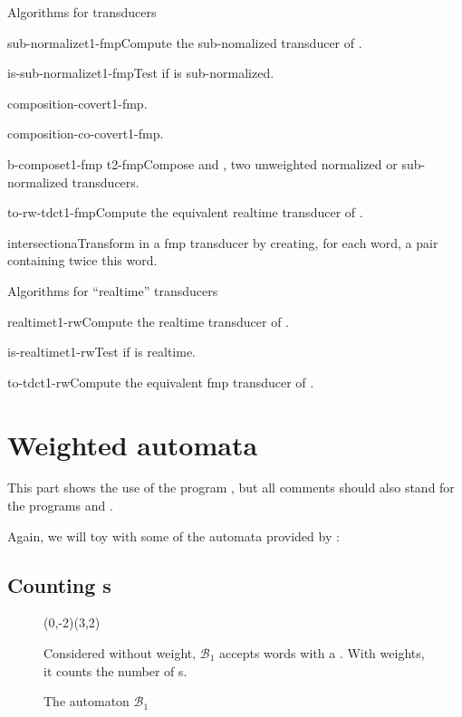\begin{fnsection}{Algorithms for transducers}
\item{sub-normalize}{t1-fmp}{Compute the sub-nomalized transducer of
    .}
\item{is-sub-normalize}{t1-fmp}{Test if  is
    sub-normalized.}
\item{composition-cover}{t1-fmp}{.}%
\item{composition-co-cover}{t1-fmp}{.}%
\item{b-compose}{t1-fmp t2-fmp}{Compose  and
    , two unweighted normalized or sub-normalized
    transducers.}
\item{to-rw-tdc}{t1-fmp}{Compute the equivalent realtime transducer
    of .}
\item{intersection}{a}{Transform  in a fmp transducer by
    creating, for each word, a pair containing twice this word.}
  \hline
\end{fnsection}


\begin{fnsection}{Algorithms for ``realtime'' transducers}
\item{realtime}{t1-rw}{Compute the realtime transducer of  .}
\item{is-realtime}{t1-rw}{Test if  is realtime.}
\item{to-tdc}{t1-rw}{Compute the equivalent fmp transducer of .}
\hline
\end{fnsection}

\newpage
\section{Weighted automata}

This part shows the use of the program , but
all comments should also stand for the programs
 and .

Again, we will toy with some of the automata provided by
:

\subsection{Counting s}

\begin{figure}[tp] \centering
  \begin{VCPicture}{(0,-2)(3,2)}
     
  \end{VCPicture}
  \begin{legend}
    Considered without weight, $\mathcal{B}_1$ accepts words with a
    .  With weights, it counts the number of s.
  \end{legend}
  \caption{The automaton $\mathcal{B}_1$}
  \label{fig:b1}
\end{figure}

